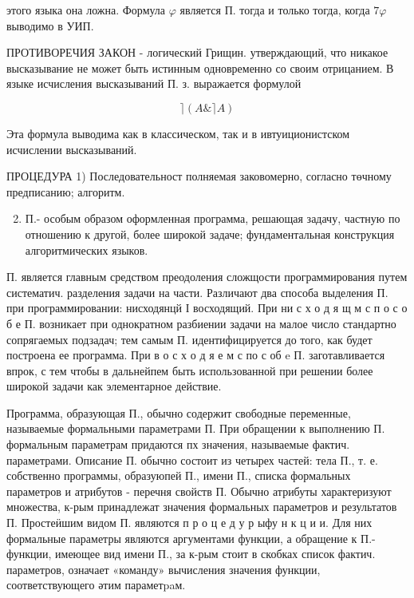 \documentclass[10pt]{article}
\begin{document}
этого языка она ложна. Формула $\varphi$ является П. тогда и только тогда, когда $7 \varphi$ выводимо в УИП.



ПРОТИВОРЕЧИЯ ЗАКОН - логический Грищин. утверждающий, что никакое высказывание не может быть истинным одновременно со своим отрицанием. В языке исчисления высказываний П. з. выражается формулой



\[

\rceil(A \&\rceil A)

\]



Эта формула выводима как в классическом, так и в ивтуиционистском исчислении высказываний.



ПРОЦЕДУРА 1) Последовательност полняемая заковомерно, согласно төчному предписанию; алгоритм.



\begin{enumerate}

  \setcounter{enumi}{1}

  \item П.- особым образом оформленная программа, решающая задачу, частную по отношению к другой, более широкой задаче; фундаментальная конструкция алгоритмических языков.

\end{enumerate}



П. является главным средством преодоления сложщости программирования путем систематич. разделения задачи на части. Различают два способа выделения П. при программировании: нисходянцй І восходящий. При ни с х о д я щ м с п о с о б е П. возникает при однократном разбиении задачи на малое число стандартно сопрягаемых подзадач; тем самым П. идентифицируется до того, как будет построена ее программа. При в о с х о д я е м с по с об e П. заготавливается впрок, с тем чтобы в дальнейпем быть использованной при решении более широкой задачи как элементарное действие.



Программа, образующая П., обычно содержит свободные переменные, называемые формальными параметрами П. При обращении к выполнению П. формальным параметрам придаются пх значения, называемые фактич. параметрами. Описание П. обычно состоит из четырех частей: тела П., т. е. собственно программы, образуюпей П., имени П., списка формальных параметров и атрибутов - перечня свойств П. Обычно атрибуты характеризуют множества, к-рым принадлежат значения формальных параметров и результатов П. Простеӥшим видом П. являются п р о ц е д у р ыфу н к ц и и. Для них формальные параметры являются аргументами функции, а обращение к П.-функции, имеющее вид имени П., за к-рым стоит в скобках список фактич. параметров, означает «команду» вычисления значения функции, соответствующего әтим параметpaм.
\end{document}
